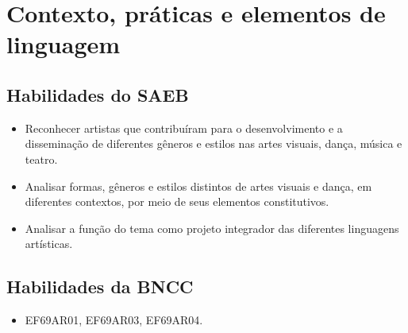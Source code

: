 \chapter{Contexto, práticas e elementos de linguagem}

\section{Habilidades do SAEB}

\begin{itemize}
  \item Reconhecer artistas que contribuíram para o desenvolvimento e a disseminação de diferentes gêneros 
  e estilos nas artes visuais, dança, música e teatro.
  \item Analisar formas, gêneros e estilos distintos de artes visuais e dança, em diferentes contextos, por 
  meio de seus elementos constitutivos.
  \item Analisar a função do tema como projeto integrador das diferentes linguagens artísticas.
\end{itemize}

\section{Habilidades da BNCC}

\begin{itemize}
  \item EF69AR01, EF69AR03, EF69AR04.
\end{itemize}


